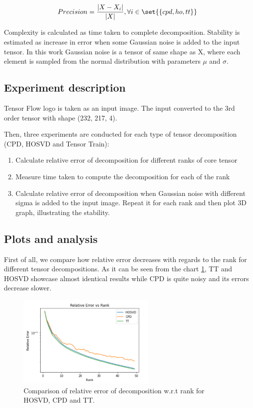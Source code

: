\documentclass[../../main.tex]{subfiles}
\begin{document}
\begin{equation}
    Precision = \frac{|X - X_i|}{|X|},  \forall i \in \set{\{cpd, ho, tt\}}
\end{equation}

Complexity is calculated as time taken to complete decomposition. Stability is estimated as increase in error when some Gaussian noise is added to the input tensor. In this work Gaussian noise is a tensor of same shape as X, where each element is sampled from the normal distribution with parameters $\mu$ and $\sigma$.

\subsection{Experiment description}

Tensor Flow logo is taken as an input image. The input converted to the 3rd order tensor with shape (232, 217, 4). 

Then, three experiments are conducted for each type of tensor decomposition (CPD, HOSVD and Tensor Train):

\begin{enumerate}
    \item Calculate relative error of decomposition for different ranks of core tensor
    \item Measure time taken to compute the decomposition for each of the rank
    \item Calculate relative error of decomposition when Gaussian noise with different sigma is added to the input image. Repeat it for each rank and then plot 3D graph, illustrating the stability.
\end{enumerate}

\subsection{Plots and analysis}

First of all, we compare how relative error decreases with regards to the rank for different tensor decompositions. As it can be seen from the chart \ref{fig:kotua:2}, TT and HOSVD showcase almost identical results while CPD is quite noisy and its errors decrease slower.

\begin{figure}[h!]
\centering
\includegraphics[width=0.6\textwidth]{figures/errors}
\caption{Comparison of relative error of decomposition w.r.t rank for HOSVD, CPD and TT.}
\label{fig:kotua:2}
\end{figure}
\end{document}
